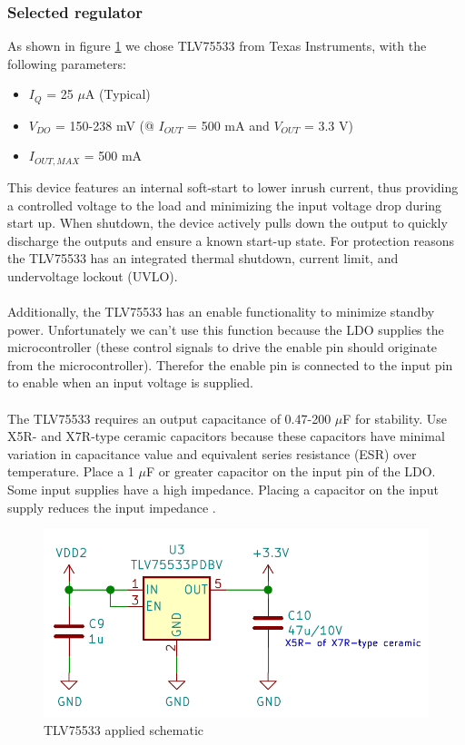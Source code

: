 \documentclass[11pt,a4paper]{article}
\begin{document}
\subsubsection{Selected regulator}
As shown in figure \ref{fig:TLV75533_toegepast} we chose TLV75533 from Texas Instruments, with the following parameters:
\begin{itemize}
	\item $I_Q$ = 25 $\mu$A (Typical)
	\item $V_{DO}$ = 150-238 mV (@ $I_{OUT}$ = 500 mA and $V_{OUT}$ = 3.3 V)
	\item $I_{OUT,MAX}$ = 500 mA
\end{itemize}
This device features an internal soft-start to lower inrush current, thus providing a controlled voltage to the load and minimizing the input voltage drop during start up. When shutdown, the device actively pulls down the output to quickly discharge the outputs and ensure a known start-up state. For protection reasons the TLV75533 has an integrated thermal shutdown, current limit, and undervoltage lockout (UVLO). 
\\ \\
Additionally, the TLV75533 has an enable functionality to minimize standby power. Unfortunately we can't use this function because the LDO supplies the microcontroller (these control signals to drive the enable pin should originate from the microcontroller). Therefor the enable pin is connected to the input pin to enable when an input voltage is supplied. 
\\ \\
The TLV75533 requires an output capacitance of 0.47-200 $\mu$F for stability. Use X5R- and X7R-type ceramic capacitors because these capacitors have minimal variation in capacitance value and equivalent series resistance (ESR) over temperature. Place a 1 $\mu$F or greater capacitor on the input pin of the LDO. Some input supplies have a high impedance. Placing a capacitor on the input supply reduces the input impedance \cite{bib:TLV755P}.
\begin{figure}[H]
	\centering
	\includegraphics[width=0.9\linewidth]{TLV75533_toegepast.png}
	\caption{TLV75533 applied schematic}
	\label{fig:TLV75533_toegepast}
\end{figure}
\end{document}
